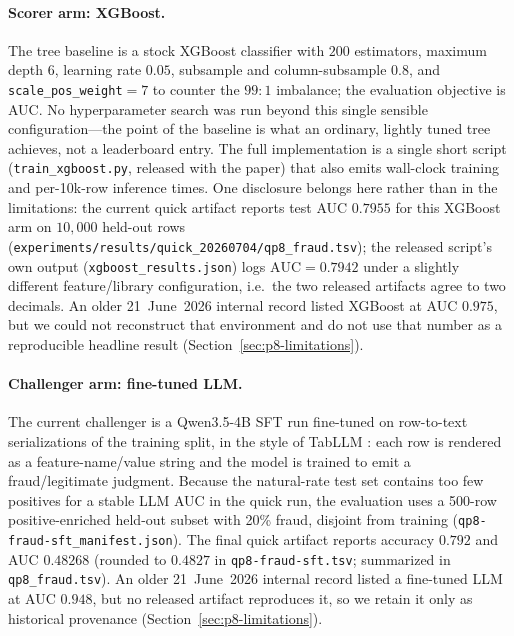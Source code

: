 \documentclass{article}
\providecommand{\secref}[1]{Section~\ref{#1}}
\begin{document}
\paragraph{Scorer arm: XGBoost.}
The tree baseline is a stock XGBoost classifier \citep{chen2016xgboost} with
$200$ estimators, maximum depth $6$, learning rate $0.05$, subsample and
column-subsample $0.8$, and \texttt{scale\_pos\_weight}$=7$ to counter the
$99{:}1$ imbalance; the evaluation objective is AUC. No hyperparameter search
was run beyond this single sensible configuration---the point of the baseline
is what an ordinary, lightly tuned tree achieves, not a leaderboard entry. The
full implementation is a single short script (\texttt{train\_xgboost.py},
released with the paper) that also emits wall-clock training and per-10k-row
inference times. One disclosure belongs here rather than in the limitations:
the current quick artifact reports test AUC $0.7955$ for this XGBoost arm
on $10{,}000$ held-out rows
(\texttt{experiments/results/quick\_20260704/qp8\_fraud.tsv}); the released
script's own output (\texttt{xgboost\_results.json}) logs
$\mathrm{AUC}{=}0.7942$ under a slightly different feature/library
configuration, i.e.\ the two released artifacts agree to two decimals. An older
21~June~2026 internal record listed XGBoost at AUC $0.975$, but we could not
reconstruct that environment and do not use that number as a reproducible
headline result (\secref{sec:p8-limitations}).

\paragraph{Challenger arm: fine-tuned LLM.}
The current challenger is a Qwen3.5-4B SFT run fine-tuned on row-to-text
serializations of the training split, in the style of TabLLM
\citep{hegselmann2023tabllm}: each row is rendered as a feature-name/value
string and the model is trained to emit a fraud/legitimate judgment. Because
the natural-rate test set contains too few positives for a stable LLM AUC in
the quick run, the evaluation uses a 500-row positive-enriched held-out subset
with 20\% fraud, disjoint from training
(\texttt{qp8-fraud-sft\_manifest.json}). The final quick artifact reports
accuracy $0.792$ and AUC $0.48268$ (rounded to $0.4827$ in
\texttt{qp8-fraud-sft.tsv}; summarized in \texttt{qp8\_fraud.tsv}). An older
21~June~2026 internal record listed a fine-tuned LLM at AUC $0.948$, but no
released artifact reproduces it, so we retain it only as historical provenance
(\secref{sec:p8-limitations}).
\end{document}
